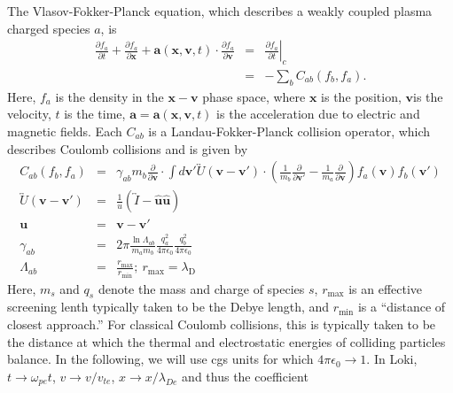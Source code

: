 \documentclass[11pt]{amsart}
\begin{document}
The Vlasov-Fokker-Planck equation, which describes a weakly coupled
plasma charged species $a$, is
\begin{eqnarray}
\label{eq1}
\frac{\partial f_{a}}{\partial t}+\frac{\partial f_{a}}{\partial\boldsymbol{x}}+\boldsymbol{a}\left
(\boldsymbol{x},\boldsymbol{v},t\right)\cdot\frac{\partial f_{a}}{\partial\boldsymbol{v}} & = & 
\left.\frac{\partial f_{a}}{\partial t}\right|_{c}\\
 & = & -\sum_{b}C_{ab}(f_{b},f_{a}).
\end{eqnarray}
 Here, $f_{a}$ is the density in the $\boldsymbol{x}-\boldsymbol{v}$
phase space, where $\boldsymbol{x}$ is the position, $\boldsymbol{v}$is
the velocity, $t$ is the time, $\boldsymbol{a}=\boldsymbol{a}\left(\boldsymbol{x},\boldsymbol{v},t\right)$
is the acceleration due to electric and magnetic fields. Each $C_{ab}$
is a Landau-Fokker-Planck collision operator, which describes Coulomb
collisions and is given by
\begin{eqnarray*}
C_{ab}(f_{b},f_{a}) & = & \gamma_{ab}m_{b}\frac{\partial}{\partial\boldsymbol{v}}\cdot\int d\boldsymbol{v}'\overleftrightarrow{U}\left(\boldsymbol{v}-\boldsymbol{v}'\right)\cdot\left(\frac{1}{m_{b}}
\frac{\partial}{\partial\boldsymbol{v}'}-\frac{1}{m_{a}}\frac{\partial}{\partial\boldsymbol{v}}\right)f_{a}\left(\boldsymbol{v}\right)f_{b}\left(\boldsymbol{v}'\right)\\
\overleftrightarrow{U}\left(\boldsymbol{v}-\boldsymbol{v}'\right) & = & \frac{1}{u}\left(\overleftrightarrow{I}-\hat{\boldsymbol{u}}\hat{\boldsymbol{u}}\right)\\
\boldsymbol{u} & = & \boldsymbol{v}-\boldsymbol{v}'\\
\gamma_{ab} & = & 2\pi\frac{\ln\varLambda_{ab}}{m_{a}m_{b}}\frac{q_{a}^{2}}{4\pi\epsilon_{0}}\frac{q_{b}^{2}}{4\pi\epsilon_{0}}\\
\varLambda_{ab} & = & \frac{r_{\mathrm{max}}}{r_{\mathrm{min}}};\:r_{\mathrm{max}}=\lambda_{\mathrm{D}}
\end{eqnarray*}
Here, $m_{s}$ and $q_{s}$ denote the mass and charge of species
$s$, $r_{\mathrm{max}}$ is an effective screening lenth typically
taken to be the Debye length, and $r_{\mathrm{min}}$ is a ``distance
of closest approach.'' For classical Coulomb collisions, this is
typically taken to be the distance at which the thermal and electrostatic
energies of colliding particles balance. In the following, we will use cgs units for which $4 \pi \epsilon_{0}  \to 1$.
In Loki, $t \to \omega_{pe} t$, $v \to v/v_{te} $, $x \to x/\lambda_{De} $ and thus the coefficient
\end{document}
